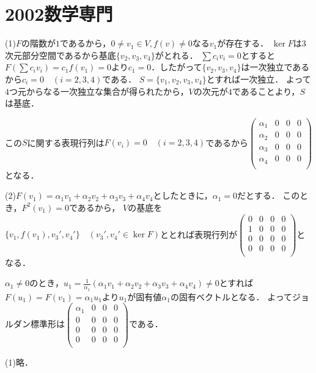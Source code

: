\documentclass[
		book,
		head_space=20mm,
		foot_space=20mm,
		gutter=10mm,
		line_length=190mm
]{jlreq}
\begin{document}
\section{2002数学専門}
(1)$F$の階数が$1$であるから，$0\neq v_1\in V,f(v)\neq 0$なる$v_1$が存在する．
$\ker F$は$3$次元部分空間であるから基底$\{v_2,v_3,v_4\}$がとれる．
$\sum c_i v_i=0$とすると$F(\sum c_iv_i)=c_1f(v_1)=0$より$c_1=0$．したがって$\{v_2,v_3,v_4\}$は一次独立であるから$c_i=0\quad(i=2,3,4)$である．
$S=\{ v_1,v_2,v_3,v_4\}$とすれば一次独立．
よって$4$つ元からなる一次独立な集合が得られたから，$V$の次元が$4$であることより，$S$は基底．

この$S$に関する表現行列は$F(v_i)=0\quad(i=2,3,4)$であるから$\begin{pmatrix}
\alpha_1 & 0 & 0 & 0\\
\alpha_2 & 0 & 0 & 0\\
\alpha_3 & 0 & 0 & 0\\
\alpha_4 & 0 & 0 & 0\\
\end{pmatrix}$となる．

(2)$F(v_1)=\alpha_1v_1+\alpha_2v_2+\alpha_3v_3+\alpha_4v_4$としたときに，$\alpha_1=0$だとする．
このとき，$F^2(v_1)=0$であるから，
$V$の基底を$\{ v_1,f(v_1),v_3',v_4'\}\quad(v_3',v_4'\in \ker F)$ととれば表現行列が$\begin{pmatrix}
    0 & 0 & 0 & 0\\
    1 & 0 & 0 & 0\\
    0 & 0 & 0 & 0\\
    0 & 0 & 0 & 0\\
\end{pmatrix}$となる．

$\alpha_1\neq 0$のとき，$u_1=\frac{1}{\alpha_1}(\alpha_1v_1+\alpha_2v_2+\alpha_3v_3+\alpha_4v_4)\neq 0$とすれば
$F(u_1)=F(v_1)=\alpha_1 u_1$より$u_1$が固有値$\alpha_1$の固有ベクトルとなる．
よってジョルダン標準形は$\begin{pmatrix}
    \alpha_1 & 0 & 0 & 0\\
    0 & 0 & 0 & 0\\
    0 & 0 & 0 & 0\\
    0 & 0 & 0 & 0\\
\end{pmatrix}$である．

(1)略．
\end{document}
